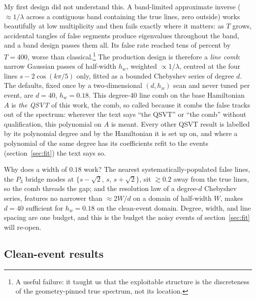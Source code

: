 \documentclass[11pt,a4paper]{article}
\begin{document}
My first design did not understand this. A band-limited approximate
inverse ($\approx1/\lambda$ across a contiguous band containing the
true lines, zero outside) works beautifully at low multiplicity and
then fails exactly where it matters: as $T$ grows, accidental tangles
of false segments produce eigenvalues throughout the band, and a band
design passes them all. Its false rate reached tens of percent by
$T=400$, worse than classical.\footnote{A useful
failure: it taught us that the exploitable structure is the
discreteness of the geometry-pinned true spectrum, not its location.}
The production design is therefore a \emph{line comb}: narrow Gaussian
passes of half-width $h_w$, weighted $\propto1/\lambda$, centred at
the four lines $s-2\cos(k\pi/5)$ only, fitted as a bounded Chebyshev
series of degree $d$. The defaults, fixed once by a two-dimensional
$(d,h_w)$ scan and never tuned per event, are $d=40$, $h_w=0.18$.
This degree-40 line comb on the base Hamiltonian $A$ is \emph{the
QSVT} of this work, the comb, so called because it combs the false
tracks out of the spectrum: wherever the text says ``the QSVT'' or
``the comb'' without qualification, this polynomial on $A$ is meant.
Every other QSVT result is labelled by its polynomial degree and by
the Hamiltonian it is set up on, and where a polynomial of the same
degree has its coefficients refit to the events
(section~\ref{sec:fit}) the text says so.

Why does a width of $0.18$ work? The nearest systematically-populated
false lines, the $P_3$ bridge modes at $\{s-\sqrt2,\,s,\,s+\sqrt2\}$,
sit $\gtrsim0.2$ away from the true lines, so the comb threads the
gap; and the resolution law of a degree-$d$ Chebyshev series, features
no narrower than $\approx 2W/d$ on a domain of half-width $W$, makes
$d=40$ sufficient for $h_w=0.18$ on the clean-event domain. Degree,
width, and line spacing are one budget, and this is the budget the
noisy events of section~\ref{sec:fit} will re-open.

\subsection{Clean-event results}
\label{sec:comb:results}
\end{document}
